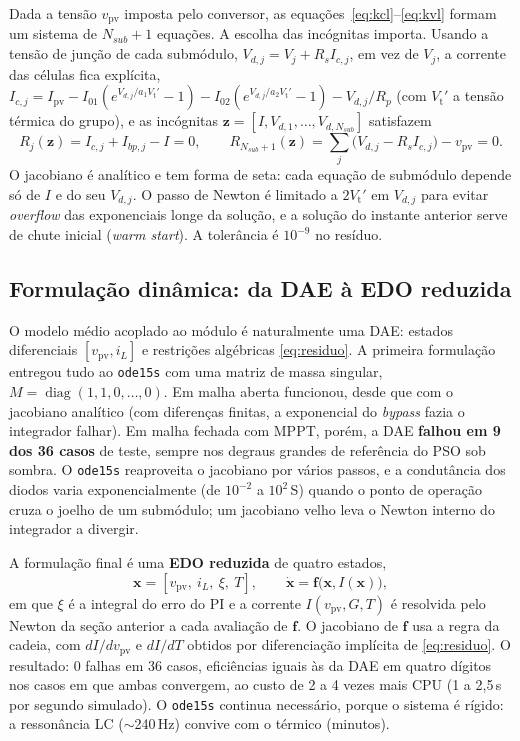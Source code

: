 \documentclass[3p,authoryear]{elsarticle}
\newcommand{\vpv}{v_{\mathrm{pv}}}
\newcommand{\Ipv}{I_{\mathrm{pv}}}
\newcommand{\Vt}{V_{\mathrm{t}}}
\begin{document}
Dada a tensão $\vpv$ imposta pelo conversor, as equações~\eqref{eq:kcl}--\eqref{eq:kvl} formam
um sistema de $N_{sub}+1$ equações. A escolha das incógnitas importa. Usando a tensão de
junção de cada submódulo, $V_{d,j} = V_j + R_s I_{c,j}$, em vez de $V_j$, a corrente das
células fica explícita,
$I_{c,j} = \Ipv - I_{01}(e^{V_{d,j}/a_1\Vt'} - 1) - I_{02}(e^{V_{d,j}/a_2\Vt'} - 1) -
V_{d,j}/R_p$ (com $\Vt'$ a tensão térmica do grupo), e as incógnitas
$\mathbf z = [I, V_{d,1}, \dots, V_{d,N_{sub}}]$ satisfazem
\begin{equation}
R_j(\mathbf z) = I_{c,j} + I_{bp,j} - I = 0,\qquad
R_{N_{sub}+1}(\mathbf z) = \sum_j \big(V_{d,j} - R_s I_{c,j}\big) - \vpv = 0.
\label{eq:residuo}
\end{equation}
O jacobiano é analítico e tem forma de seta: cada equação de submódulo depende só de $I$ e
do seu $V_{d,j}$. O passo de Newton é limitado a $2\Vt'$ em $V_{d,j}$ para evitar
\emph{overflow} das exponenciais longe da solução, e a solução do instante anterior serve
de chute inicial (\emph{warm start}). A tolerância é $10^{-9}$ no resíduo.

\subsection{Formulação dinâmica: da DAE à EDO reduzida}
\label{sec:edo}

O modelo médio acoplado ao módulo é naturalmente uma DAE: estados diferenciais
$[\vpv, i_L]$ e restrições algébricas \eqref{eq:residuo}. A primeira formulação entregou
tudo ao \texttt{ode15s} \citep{shampine} com uma matriz de massa singular,
$M = \operatorname{diag}(1,1,0,\dots,0)$. Em malha aberta funcionou, desde que com o
jacobiano analítico (com diferenças finitas, a exponencial do \emph{bypass} fazia o
integrador falhar). Em malha fechada com MPPT, porém, a DAE \textbf{falhou em 9 dos 36
casos} de teste, sempre nos degraus grandes de referência do PSO sob sombra. O
\texttt{ode15s} reaproveita o jacobiano por vários passos, e a condutância dos diodos varia
exponencialmente (de $10^{-2}$ a $10^{2}$\,S) quando o ponto de operação cruza o joelho de um
submódulo; um jacobiano velho leva o Newton interno do integrador a divergir.

A formulação final é uma \textbf{EDO reduzida} de quatro estados,
\begin{equation}
\mathbf x = [\vpv,\ i_L,\ \xi,\ T], \qquad
\dot{\mathbf x} = \mathbf f\big(\mathbf x, I(\mathbf x)\big),
\label{eq:edo}
\end{equation}
em que $\xi$ é a integral do erro do PI e a corrente $I(\vpv, G, T)$ é resolvida pelo Newton
da seção anterior a cada avaliação de $\mathbf f$. O jacobiano de $\mathbf f$ usa a regra da
cadeia, com $dI/d\vpv$ e $dI/dT$ obtidos por diferenciação implícita de \eqref{eq:residuo}.
O resultado: 0 falhas em 36 casos, eficiências iguais às da DAE em quatro dígitos nos casos
em que ambas convergem, ao custo de 2 a 4 vezes mais CPU (1 a 2,5\,s por segundo simulado).
O \texttt{ode15s} continua necessário, porque o sistema é rígido: a ressonância LC
($\sim$240\,Hz) convive com o térmico (minutos).
\end{document}
